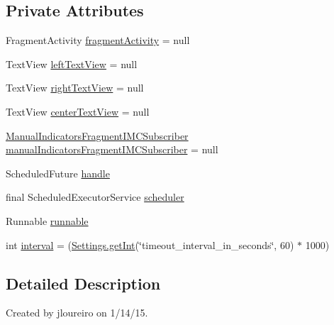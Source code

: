 \subsection*{Private Attributes}
\begin{DoxyCompactItemize}
\item 
Fragment\+Activity \hyperlink{classpt_1_1lsts_1_1asa_1_1fragments_1_1ManualIndicatorsFragment_a1cb79f4c38ab9a703b46652568dc984d}{fragment\+Activity} = null
\item 
Text\+View \hyperlink{classpt_1_1lsts_1_1asa_1_1fragments_1_1ManualIndicatorsFragment_a3b66f3afc472cbd4fb22f5a479a474c9}{left\+Text\+View} = null
\item 
Text\+View \hyperlink{classpt_1_1lsts_1_1asa_1_1fragments_1_1ManualIndicatorsFragment_a9324b8eea06f2500223307a43d7ddcfc}{right\+Text\+View} = null
\item 
Text\+View \hyperlink{classpt_1_1lsts_1_1asa_1_1fragments_1_1ManualIndicatorsFragment_aef171e095c399c66088fcf06b78cf22a}{center\+Text\+View} = null
\item 
\hyperlink{classpt_1_1lsts_1_1asa_1_1subscribers_1_1ManualIndicatorsFragmentIMCSubscriber}{Manual\+Indicators\+Fragment\+I\+M\+C\+Subscriber} \hyperlink{classpt_1_1lsts_1_1asa_1_1fragments_1_1ManualIndicatorsFragment_adaa3a7fa3a4378ea0c8f40c798835f04}{manual\+Indicators\+Fragment\+I\+M\+C\+Subscriber} = null
\item 
Scheduled\+Future \hyperlink{classpt_1_1lsts_1_1asa_1_1fragments_1_1ManualIndicatorsFragment_a6e87785cb23b08623969ad121c81875e}{handle}
\item 
final Scheduled\+Executor\+Service \hyperlink{classpt_1_1lsts_1_1asa_1_1fragments_1_1ManualIndicatorsFragment_a6f5dc4f7db203a60ff03112379b4fc10}{scheduler}
\item 
Runnable \hyperlink{classpt_1_1lsts_1_1asa_1_1fragments_1_1ManualIndicatorsFragment_a6d03a45c42d82392c0cd605bc0d1ccb8}{runnable}
\item 
int \hyperlink{classpt_1_1lsts_1_1asa_1_1fragments_1_1ManualIndicatorsFragment_a5c9aaf2da9fdecdc1e8544ac75e00a91}{interval} = (\hyperlink{classpt_1_1lsts_1_1asa_1_1settings_1_1Settings_a6837acc4e04ce43560ab198fb0e68acc}{Settings.\+get\+Int}(\char`\"{}timeout\+\_\+interval\+\_\+in\+\_\+seconds\char`\"{}, 60) $\ast$ 1000)
\end{DoxyCompactItemize}


\subsection{Detailed Description}
Created by jloureiro on 1/14/15. 

